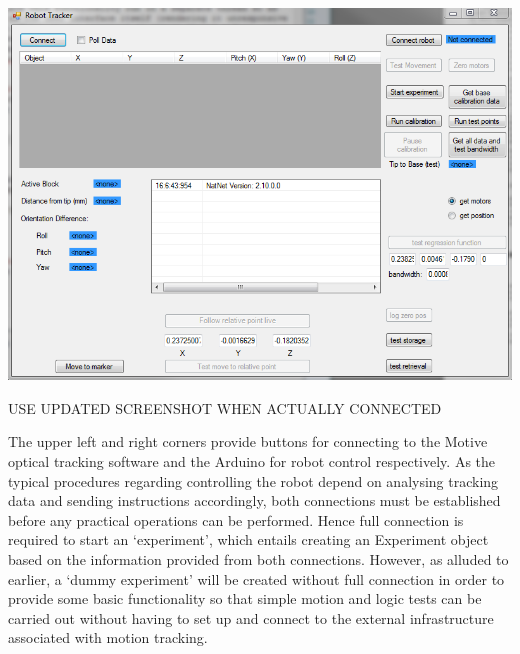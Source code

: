 \documentclass[11pt]{article}
\begin{document}
\begin{center}
\includegraphics[width=\textwidth]{images/userInterface.png}
\label{figure:userInterface}
\end{center}

USE UPDATED SCREENSHOT WHEN ACTUALLY CONNECTED

The upper left and right corners provide buttons for connecting to the Motive optical tracking software and the Arduino for robot control respectively. As the typical procedures regarding controlling the robot depend on analysing tracking data and sending instructions accordingly, both connections must be established before any practical operations can be performed. Hence full connection is required to start an `experiment', which entails creating an Experiment object based on the information provided from both connections. However, as alluded to earlier, a `dummy experiment' will be created without full connection in order to provide some basic functionality so that simple motion and logic tests can be carried out without having to set up and connect to the external infrastructure associated with motion tracking. 
\end{document}
